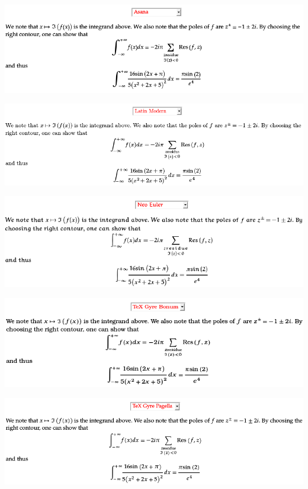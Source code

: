 \includegraphics[width=\textwidth]{screenshots/4-mathml-fonts-asana}

\includegraphics[width=\textwidth]{screenshots/4-mathml-fonts-latin-modern}

\includegraphics[width=\textwidth]{screenshots/4-mathml-fonts-neo-euler}

\includegraphics[width=\textwidth]{screenshots/4-mathml-fonts-tex-gyre-bonum}

\includegraphics[width=\textwidth]{screenshots/4-mathml-fonts-tex-gyre-pagella}

